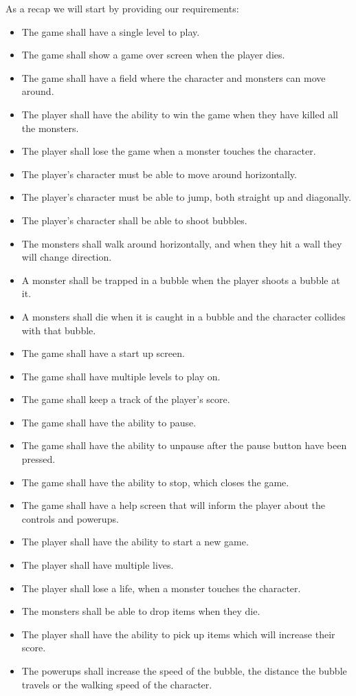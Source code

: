 As a recap we will start by providing our requirements: \\
\begin{itemize}
    \item The game shall have a single level to play.
    \item The game shall show a game over screen when the player dies.
  \item The game shall have a field where the character and monsters can move around.
    \item The player shall have the ability to win the game when they have killed all the monsters.
  \item The player shall lose the game when a monster touches the character.
    \item The player's character must be able to move around horizontally.
    \item The player's character must be able to jump, both straight up and diagonally.
    \item The player's character shall be able to shoot bubbles.
    \item The monsters shall walk around horizontally, and when they hit a wall they will change direction. 
  \item A monster shall be trapped in a bubble when the player shoots a bubble at it.
  \item A monsters shall die when it is caught in a bubble and the character collides with that bubble.
   \item The game shall have a start up screen.
   \item The game shall have multiple levels to play on.
   \item The game shall keep a track of the player's score.
   \item The game shall have the ability to pause.
   \item The game shall have the ability to unpause after the pause button have been pressed.
   \item The game shall have the ability to stop, which closes the game.
   \item The game shall have a help screen that will inform the player about the controls and powerups.
   \item The player shall have the ability to start a new game.
   \item The player shall have multiple lives.
   \item The player shall lose a life, when a monster touches the character. 
   \item The monsters shall be able to drop items when they die.
   \item The player shall have the ability to pick up items which will increase their score.
   \item The powerups shall increase the speed of the bubble, the distance the bubble travels or the walking speed of the character.
\end{itemize}

